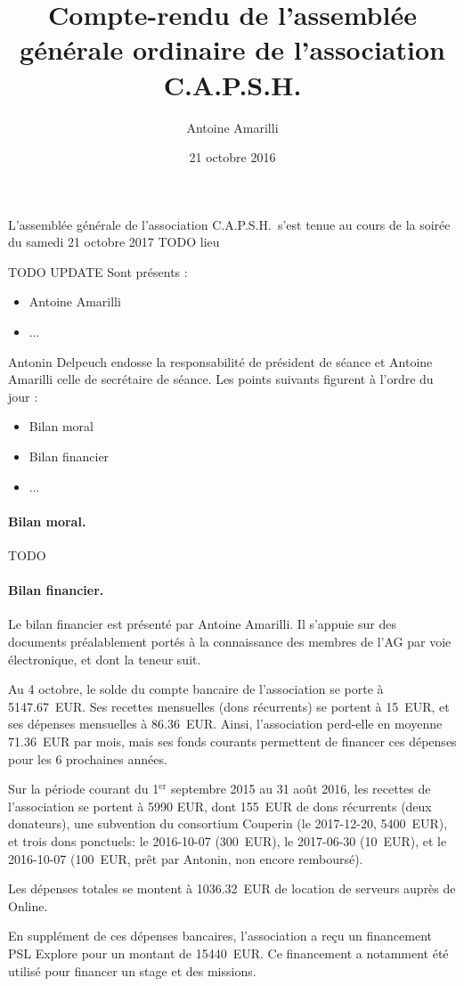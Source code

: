 \documentclass{scrartcl}
\title{Compte-rendu de l'assemblée générale ordinaire de l'association C.A.P.S.H.}
\author{Antoine Amarilli}
\date{21 octobre 2016}
\begin{document}
\maketitle

L'assemblée générale de l'association C.A.P.S.H.\ s'est tenue au cours de la
soirée du samedi 21 octobre 2017 TODO lieu

TODO UPDATE
% 
Sont présents :

\medskip

\begin{itemize}
\item Antoine Amarilli
\item ...
\end{itemize}

\medskip

Antonin Delpeuch endosse la responsabilité de président de séance et Antoine
Amarilli celle de secrétaire de séance. Les points suivants figurent à l'ordre
du jour :

\medskip

\begin{itemize}
\item Bilan moral
\item Bilan financier
\item ...
\end{itemize}

\paragraph{Bilan moral.} TODO

\paragraph{Bilan financier.} Le bilan financier est présenté par Antoine
Amarilli. Il s'appuie sur des documents préalablement portés à la connaissance des
membres de l'AG par voie électronique, et dont la teneur suit.

Au 4 octobre, le solde du compte bancaire de l'association se porte à 5147.67~EUR. 
Ses recettes mensuelles (dons récurrents) se portent à 15~EUR, et ses dépenses
mensuelles à 86.36~EUR. Ainsi, l'association perd-elle en moyenne 71.36~EUR par
mois, mais ses fonds courants permettent de financer ces dépenses pour les 6
prochaines années.

Sur la période courant du 1$^{\mathrm{er}}$ septembre 2015 au 31 août 2016, les
recettes de l'association se portent à 5990 EUR, dont 155~EUR de dons récurrents
(deux donateurs), une subvention du consortium Couperin (le 2017-12-20,
5400~EUR), et trois dons ponctuels: le 2016-10-07 (300~EUR), le 2017-06-30
(10~EUR), et le 2016-10-07 (100~EUR, prêt par Antonin, non encore remboursé).

Les dépenses totales se montent à 1036.32~EUR de location de serveurs auprès de
Online.

En supplément de ces dépenses bancaires, l'association a reçu un financement PSL
Explore pour un montant de 15440~EUR. Ce financement a notamment été utilisé
pour financer un stage et des missions.

\bigskip

\end{document}
